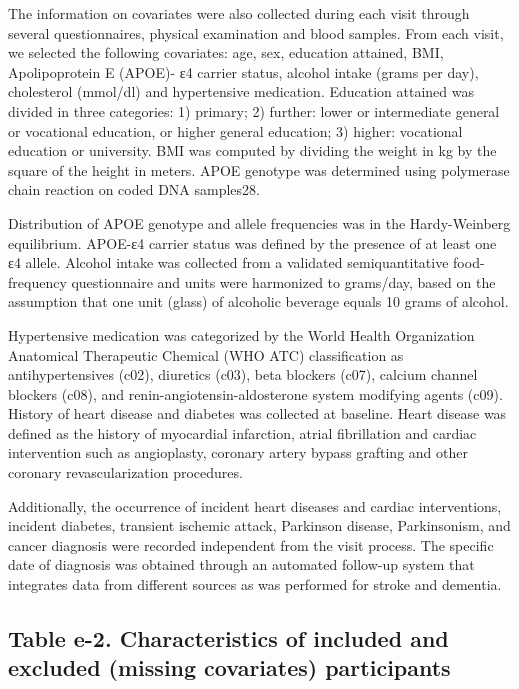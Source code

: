 \documentclass[
]{book}
\begin{document}
The information on covariates were also collected during each visit through several questionnaires, physical examination and blood samples. From each visit, we selected the following covariates: age, sex, education attained, BMI, Apolipoprotein E (APOE)- ε4 carrier status, alcohol intake (grams per day), cholesterol (mmol/dl) and hypertensive medication. Education attained was divided in three categories: 1) primary; 2) further: lower or intermediate general or vocational education, or higher general education; 3) higher: vocational education or university\autocite{ott1999}. BMI was computed by dividing the weight in kg by the square of the height in meters. APOE genotype was determined using polymerase chain reaction on coded DNA samples28.

Distribution of APOE genotype and allele frequencies was in the Hardy-Weinberg equilibrium. APOE-ε4 carrier status was defined by the presence of at least one ε4 allele. Alcohol intake was collected from a validated semiquantitative food-frequency questionnaire and units were harmonized to grams/day, based on the assumption that one unit (glass) of alcoholic beverage equals 10 grams of alcohol\autocite{ruitenberg2002}.

Hypertensive medication was categorized by the World Health Organization Anatomical Therapeutic Chemical (WHO ATC) classification as antihypertensives (c02), diuretics (c03), beta blockers (c07), calcium channel blockers (c08), and renin-angiotensin-aldosterone system modifying agents (c09). History of heart disease and diabetes was collected at baseline. Heart disease was defined as the history of myocardial infarction, atrial fibrillation and cardiac intervention such as angioplasty, coronary artery bypass grafting and other coronary revascularization procedures\autocite{leening2012}.

Additionally, the occurrence of incident heart diseases and cardiac interventions, incident diabetes, transient ischemic attack, Parkinson disease, Parkinsonism, and cancer diagnosis were recorded independent from the visit process. The specific date of diagnosis was obtained through an automated follow-up system that integrates data from different sources as was performed for stroke and dementia.

\hypertarget{table-e-2.-characteristics-of-included-and-excluded-missing-covariates-participants}{%
\subsection{Table e-2. Characteristics of included and excluded (missing covariates) participants}\label{table-e-2.-characteristics-of-included-and-excluded-missing-covariates-participants}}
\end{document}
